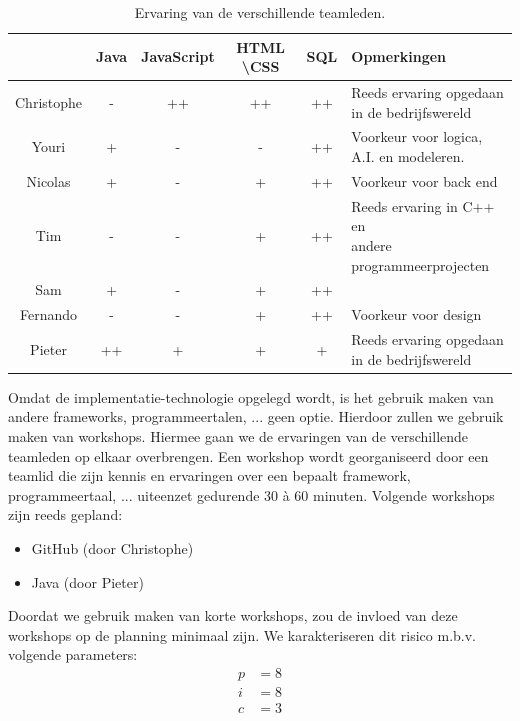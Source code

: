 \begin{table} [htbp]
	\centering
  	\caption{Ervaring van de verschillende teamleden.}
    \begin{tabular}{c|ccccl}
  		  	& Java 	& JavaScript & HTML \textbackslash CSS 		& SQL 	& Opmerkingen \\
  		  	\hline
  		  	Christophe & -	& ++ 		& ++ 		& ++ & \shortstack{ Reeds ervaring opgedaan \\ in de bedrijfswereld} \\
  		  	Youri & + & - & - & ++ & \shortstack{Voorkeur voor logica, \\ A.I. en modeleren.} \\
  		  	Nicolas & + & - & + & ++ & Voorkeur voor back end \\
  		  	Tim & - & - & + & ++ & \shortstack{Reeds ervaring in C++ en \\ andere programmeerprojecten} \\
  		  	Sam & + & - & + & ++ & \\
  		  	Fernando & - & - & + & ++ & Voorkeur voor design \\
  		  	Pieter & ++ & + & + & + & \shortstack{Reeds ervaring opgedaan \\ in de bedrijfswereld}
    \end{tabular}
  	\label{tab:skilllevel}
\end{table}
Omdat de implementatie-technologie opgelegd wordt, is het gebruik maken van andere frameworks, programmeertalen, ... geen optie. Hierdoor zullen we gebruik maken van workshops. Hiermee gaan we de ervaringen van de verschillende teamleden op elkaar overbrengen. Een workshop wordt georganiseerd door een teamlid die zijn kennis en ervaringen over een bepaalt framework, programmeertaal, ... uiteenzet gedurende 30 \`{a} 60 minuten. Volgende workshops zijn reeds gepland:
\begin{itemize}
	\item GitHub (door Christophe)
	\item Java (door Pieter)
\end{itemize}
Doordat we gebruik maken van korte workshops, zou de invloed van deze workshops op de planning minimaal zijn. We karakteriseren dit risico m.b.v. volgende parameters:
\begin{align*}
	p &= 8\\
	i &= 8\\
	c &= 3
\end{align*}

